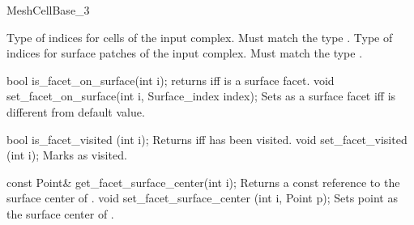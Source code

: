 \begin{ccRefConcept}{MeshCellBase_3}

{Type of indices for cells of the input complex. Must match the type .}
\ccGlue
{}
{Type of indices for surface patches of the input complex. Must match the type .}


\ccOperations



\ccMethod
{bool is_facet_on_surface(int i);}
{returns  iff  is a surface facet. }
\ccGlue
\ccMethod
{void set_facet_on_surface(int i, Surface_index index);}
{Sets  as a surface facet  iff  is
  different from  default value.}

\ccMethod
{bool is_facet_visited (int i);}
{Returns  iff  has been visited.}
\ccGlue
\ccMethod
{void set_facet_visited (int i);} 
{Marks  as visited.}

\ccMethod
{const Point& get_facet_surface_center(int i);}
{Returns a const reference to the surface center of .}
\ccGlue
\ccMethod
{void set_facet_surface_center (int i, Point p);} 
{Sets point  as the surface center of .}


\ccHasModels
{}


\ccSeeAlso

 \\
 \\

\end{ccRefConcept}

\ccRefPageEnd

